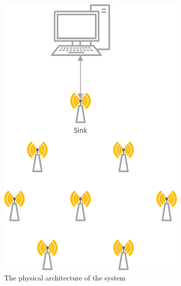 \begin{figure}[htbp]
	\centering
	\begin{subfigure}[t]{0.4\textwidth}
		\centering
    		\includegraphics[scale=0.7]{content/images/Architecture}
   	 	\caption{The physical architecture of the system}
    	\label{fig:architecture}
    \end{subfigure}
    \quad
    \quad
    \quad
    \begin{subfigure}[t]{0.4\textwidth}
		\centering         

\end{subfigure}
\end{figure}
